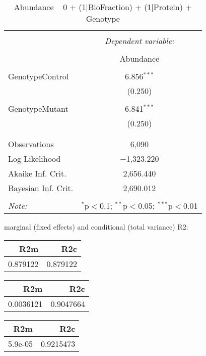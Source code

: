 \documentclass[11pt]{report}
\begin{document}
\begin{table}[!htbp] \centering 
  \caption{Abundance ~ 0 + (1|BioFraction) + (1|Protein) + Genotype} 
  \label{} 
\begin{tabular}{@{\extracolsep{5pt}}lc} 
\\[-1.8ex]\hline 
\hline \\[-1.8ex] 
 & \multicolumn{1}{c}{\textit{Dependent variable:}} \\ 
\cline{2-2} 
\\[-1.8ex] & Abundance \\ 
\hline \\[-1.8ex] 
 GenotypeControl & 6.856$^{***}$ \\ 
  & (0.250) \\ 
  & \\ 
 GenotypeMutant & 6.841$^{***}$ \\ 
  & (0.250) \\ 
  & \\ 
\hline \\[-1.8ex] 
Observations & 6,090 \\ 
Log Likelihood & $-$1,323.220 \\ 
Akaike Inf. Crit. & 2,656.440 \\ 
Bayesian Inf. Crit. & 2,690.012 \\ 
\hline 
\hline \\[-1.8ex] 
\textit{Note:}  & \multicolumn{1}{r}{$^{*}$p$<$0.1; $^{**}$p$<$0.05; $^{***}$p$<$0.01} \\ 
\end{tabular} 
\end{table} 
marginal (fixed effects) and conditional (total variance) R2:

\begin{tabular}{r|r}
\hline
R2m & R2c\\
\hline
0.879122 & 0.879122\\
\hline
\end{tabular}

\begin{tabular}{r|r}
\hline
R2m & R2c\\
\hline
0.0036121 & 0.9047664\\
\hline
\end{tabular}

\begin{tabular}{r|r}
\hline
R2m & R2c\\
\hline
5.9e-05 & 0.9215473\\
\hline
\end{tabular}
\end{document}
